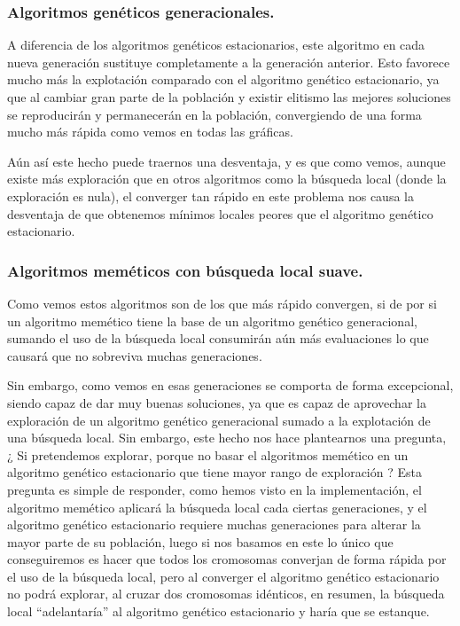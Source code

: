 \documentclass[12pt, spanish]{article}
\begin{document}
\subsubsection{Algoritmos genéticos generacionales.}

A diferencia de los algoritmos genéticos estacionarios, este algoritmo en cada nueva generación sustituye completamente a la generación anterior. Esto favorece mucho más la explotación comparado con el algoritmo genético estacionario, ya que al cambiar gran parte de la población y existir elitismo las mejores soluciones se reproducirán y permanecerán en la población, convergiendo de una forma mucho más rápida como vemos en todas las gráficas.

Aún así este hecho puede traernos una desventaja, y es que como vemos, aunque existe más exploración que en otros algoritmos como la búsqueda local (donde la exploración es nula), el converger tan rápido en este problema nos causa la desventaja de que obtenemos mínimos locales peores que el algoritmo genético estacionario.

\newpage

\subsubsection{Algoritmos meméticos con búsqueda local suave.}

Como vemos estos algoritmos son de los que más rápido convergen, si de por si un algoritmo memético tiene la base de un algoritmo genético generacional, sumando el uso de la búsqueda local consumirán aún más evaluaciones lo que causará que no sobreviva muchas generaciones.

Sin embargo, como vemos en esas generaciones se comporta de forma excepcional, siendo capaz de dar muy buenas soluciones, ya que es capaz de aprovechar la exploración de un algoritmo genético generacional sumado a la explotación de una búsqueda local. Sin embargo, este hecho nos hace plantearnos una pregunta, ¿ Si pretendemos explorar, porque no basar el algoritmos memético en un algoritmo genético estacionario que tiene mayor rango de exploración ? Esta pregunta es simple de responder, como hemos visto en la implementación, el algoritmo memético aplicará la búsqueda local cada ciertas generaciones, y el algoritmo genético estacionario requiere muchas generaciones para alterar la mayor parte de su población, luego si nos basamos en este lo único que conseguiremos es hacer que todos los cromosomas converjan de forma rápida por el uso de la búsqueda local, pero al converger el algoritmo genético estacionario no podrá explorar, al cruzar dos cromosomas idénticos, en resumen, la búsqueda local ``adelantaría'' al algoritmo genético estacionario y haría que se estanque.
\end{document}
